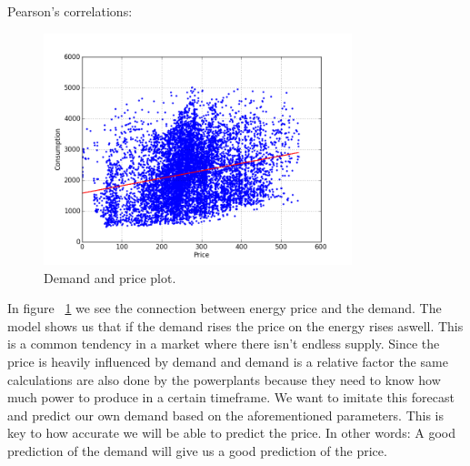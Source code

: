 Pearson's correlations:
\begin{table}[!ht]
\centering  %
\caption{Results from the simple classification approach} %
\label{table:naiveTrainingApproach} %
\end{table}

\begin{figure}[H]
\centering
\includegraphics[width=0.8\textwidth ,natwidth=410,natheight=237]{billeder/energy_price_plots/consump_price.png}
\caption{Demand and price plot.}
\label{fig:consump_price}
\end{figure}

In figure ~\ref{fig:consump_price} we see the connection between energy price and the demand. The model shows us that if the demand rises the price on the energy rises aswell. This is a common tendency in a market where there isn't endless supply. Since the price is heavily influenced by demand and demand is a relative factor the same calculations are also done by the powerplants because they need to know how much power to produce in a certain timeframe. We want to imitate this forecast and predict our own demand based on the aforementioned parameters. This is key to how accurate we will be able to predict the price. In other words: A good prediction of the demand will give us a good prediction of the price.


